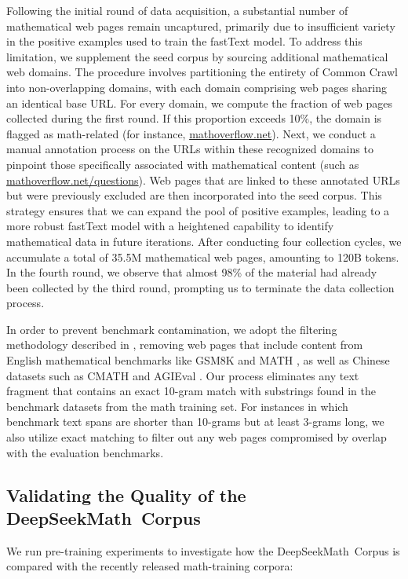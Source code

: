 \begin{itemize}[topsep=0pt]
Following the initial round of data acquisition, a substantial number of mathematical web pages remain uncaptured, primarily due to insufficient variety in the positive examples used to train the fastText model. To address this limitation, we supplement the seed corpus by sourcing additional mathematical web domains. The procedure involves partitioning the entirety of Common Crawl into non-overlapping domains, with each domain comprising web pages sharing an identical base URL. For every domain, we compute the fraction of web pages collected during the first round. If this proportion exceeds 10\%, the domain is flagged as math-related (for instance, \url{mathoverflow.net}). Next, we conduct a manual annotation process on the URLs within these recognized domains to pinpoint those specifically associated with mathematical content (such as \url{mathoverflow.net/questions}). Web pages that are linked to these annotated URLs but were previously excluded are then incorporated into the seed corpus. This strategy ensures that we can expand the pool of positive examples, leading to a more robust fastText model with a heightened capability to identify mathematical data in future iterations. After conducting four collection cycles, we accumulate a total of 35.5M mathematical web pages, amounting to 120B tokens. In the fourth round, we observe that almost 98\% of the material had already been collected by the third round, prompting us to terminate the data collection process.

In order to prevent benchmark contamination, we adopt the filtering methodology described in \cite{deepseek-coder}, removing web pages that include content from English mathematical benchmarks like GSM8K \citep{gsm8k} and MATH \citep{MATH}, as well as Chinese datasets such as CMATH \citep{wei2023cmath} and AGIEval \citep{agieval}. Our process eliminates any text fragment that contains an exact 10-gram match with substrings found in the benchmark datasets from the math training set. For instances in which benchmark text spans are shorter than 10-grams but at least 3-grams long, we also utilize exact matching to filter out any web pages compromised by overlap with the evaluation benchmarks.

\subsection{Validating the Quality of the DeepSeekMath~Corpus}

We run pre-training experiments to investigate how the DeepSeekMath~Corpus is compared with the recently released math-training corpora:


\end{itemize}
